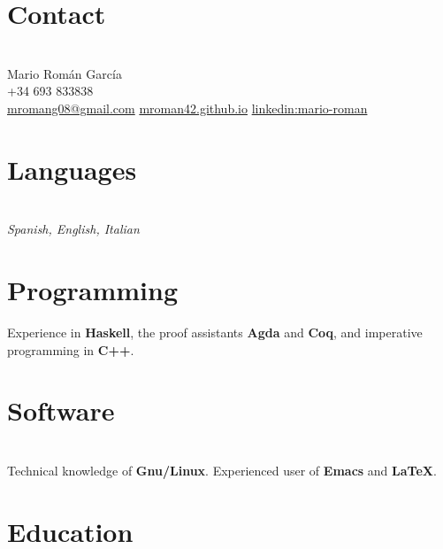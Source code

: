 \documentclass[nocolors]{friggeri-cv-a4}
\begin{document}

\begin{aside} %
  \section{Contact}\\
  Mario Román García\\
+34 693 833838\\
\href{mailto:mromang08@gmail.com}{mromang08@gmail.com}
\href{https://mroman42.github.io}{mroman42.github.io}
\href{https://www.linkedin.com/in/mario-roman}{linkedin:mario-roman}
\section{Languages}\\
\textit{Spanish,
English,
Italian}
\section{Programming}
{\small Experience in \textbf{Haskell},
  the proof assistants \textbf{Agda} and \textbf{Coq},
  and imperative programming in \textbf{C++}.
}

\section{Software}\\
{\small Technical knowledge of \textbf{Gnu/Linux}.
  Experienced user of \textbf{Emacs} and \textbf{LaTeX}.
}
\end{aside}


\section{Education}
\end{document}

